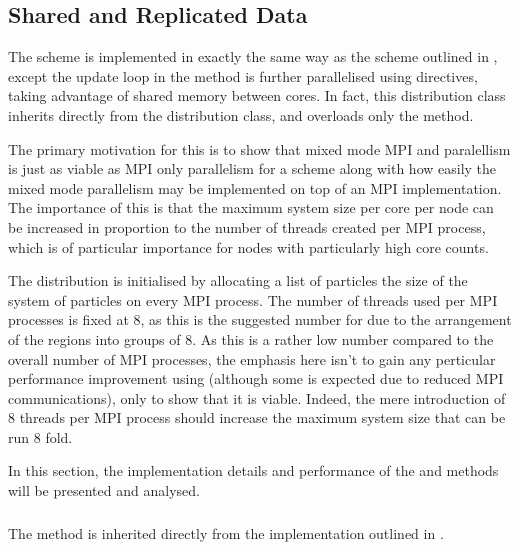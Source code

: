 \subsection{Shared and Replicated Data}

The \sharedandreplicateddata{} scheme is implemented in exactly the same
way as the \replicateddata{} scheme outlined in 
,
except the update loop in the \pairoperation{} method is further
parallelised using \openmp{} directives, taking advantage of shared
memory between cores.
%
In fact, this distribution class inherits directly from the
\replicateddata{} distribution class, and overloads only the
\pairoperation{} method.


The primary motivation for this is to show that mixed mode MPI and \openmp{}
paralellism is just as viable as MPI only parallelism for a \replicateddata{}
scheme along with how easily the mixed mode parallelism may be implemented
on top of an MPI implementation.
%
The importance of this is that the maximum system size per core per node
can be increased in proportion to the number of \openmp{} threads
created per MPI process, which is of particular importance for nodes with
particularly high core counts.

%
The \sharedandreplicateddata{} distribution is initialised by
allocating a list of particles the size of the system of particles
on every MPI process.
%
The number of \openmp{} threads used per MPI processes is fixed at 8,
as this is the suggested number for \hector{} due to the arrangement
of the \numa{} regions into groups of 8.
%
As this is a rather low number compared to the overall number of MPI
processes, the emphasis here isn't to gain any perticular performance
improvement using \openmp{} (although some is expected due to reduced
MPI communications),
only to show that it is viable.
%
Indeed, the mere introduction of 8 threads per MPI process should increase
the maximum system size that can be run 8 fold.

In this section,
the implementation details and performance of
the \individualoperation{} and \pairoperation{} methods
will be presented and analysed.


\subsubsection{\individualoperation{}}

The \individualoperation{} method is inherited directly from
the implementation outlined in
.


